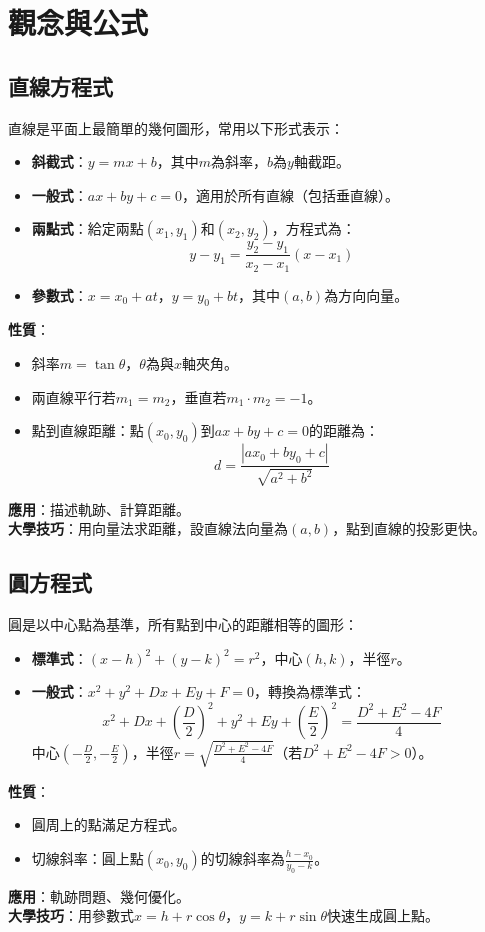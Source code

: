 
\section{觀念與公式}

\subsection{直線方程式}
直線是平面上最簡單的幾何圖形，常用以下形式表示：
\begin{itemize}
    \item \textbf{斜截式}：$y = mx + b$，其中$m$為斜率，$b$為$y$軸截距。
    \item \textbf{一般式}：$ax + by + c = 0$，適用於所有直線（包括垂直線）。
    \item \textbf{兩點式}：給定兩點$(x_1, y_1)$和$(x_2, y_2)$，方程式為：
    \[
    y - y_1 = \frac{y_2 - y_1}{x_2 - x_1} (x - x_1)
    \]
    \item \textbf{參數式}：$x = x_0 + at$，$y = y_0 + bt$，其中$(a, b)$為方向向量。
\end{itemize}
\textbf{性質}：
\begin{itemize}
    \item 斜率$m = \tan\theta$，$\theta$為與$x$軸夾角。
    \item 兩直線平行若$m_1 = m_2$，垂直若$m_1 \cdot m_2 = -1$。
    \item 點到直線距離：點$(x_0, y_0)$到$ax + by + c = 0$的距離為：
    \[
    d = \frac{|ax_0 + by_0 + c|}{\sqrt{a^2 + b^2}}
    \]
\end{itemize}
\textbf{應用}：描述軌跡、計算距離。\\
\textbf{大學技巧}：用向量法求距離，設直線法向量為$(a, b)$，點到直線的投影更快。

\subsection{圓方程式}
圓是以中心點為基準，所有點到中心的距離相等的圖形：
\begin{itemize}
    \item \textbf{標準式}：$(x - h)^2 + (y - k)^2 = r^2$，中心$(h, k)$，半徑$r$。
    \item \textbf{一般式}：$x^2 + y^2 + Dx + Ey + F = 0$，轉換為標準式：
    \[
    x^2 + Dx + \left(\frac{D}{2}\right)^2 + y^2 + Ey + \left(\frac{E}{2}\right)^2 = \frac{D^2 + E^2 - 4F}{4}
    \]
    中心$\left(-\frac{D}{2}, -\frac{E}{2}\right)$，半徑$r = \sqrt{\frac{D^2 + E^2 - 4F}{4}}$（若$D^2 + E^2 - 4F > 0$）。
\end{itemize}
\textbf{性質}：
\begin{itemize}
    \item 圓周上的點滿足方程式。
    \item 切線斜率：圓上點$(x_0, y_0)$的切線斜率為$\frac{h - x_0}{y_0 - k}$。
\end{itemize}
\textbf{應用}：軌跡問題、幾何優化。\\
\textbf{大學技巧}：用參數式$x = h + r\cos\theta$，$y = k + r\sin\theta$快速生成圓上點。

